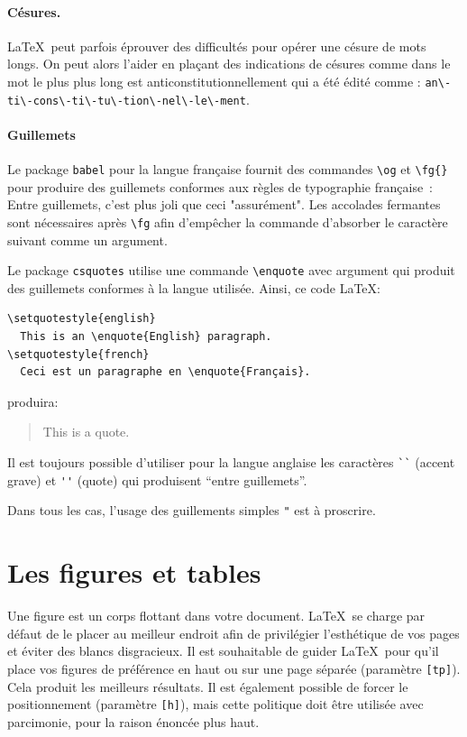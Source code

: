 \paragraph{Césures.} \LaTeX\ peut parfois éprouver des difficultés pour opérer une césure
de mots longs. On peut alors l'aider en plaçant des indications de
césures comme dans \og le mot le plus plus long est
an\-ti\-cons\-ti\-tu\-tion\-nel\-le\-ment\fg{} qui a été édité comme :
\texttt{an\textbackslash-ti\textbackslash-cons\textbackslash-ti\textbackslash-tu\textbackslash-tion\textbackslash-nel\textbackslash-le\textbackslash-ment}.

\paragraph{Guillemets} Le package \texttt{babel} pour la langue
française fournit des commandes \verb+\og+ et \verb+\fg{}+ pour
produire des guillemets conformes aux règles de typographie française~:
\og Entre guillemets, \fg{} c'est plus joli que ceci "assurément". Les
accolades fermantes sont nécessaires après \verb+\fg+ afin d'empêcher
la commande d'absorber le caractère suivant comme un argument.

Le package \texttt{csquotes} utilise une commande \verb+\enquote+ avec
argument qui produit des guillemets conformes à la langue
utilisée. Ainsi, ce code \LaTeX :
\begin{verbatim}
\setquotestyle{english}
  This is an \enquote{English} paragraph.
\setquotestyle{french}
  Ceci est un paragraphe en \enquote{Français}.    
\end{verbatim}

produira:

\begin{quote}
  This is a quote.
\end{quote}

Il est toujours possible d'utiliser pour la langue anglaise les
caractères \verb+``+ (accent grave) et \verb+''+ (quote) qui
produisent ``entre guillemets''.

Dans tous les cas, l'usage des guillements simples \og \texttt{"}
\fg{} est à proscrire.


\section{Les figures et tables}
\label{sec:figandtab}

Une figure est un corps flottant dans votre document. \LaTeX\ se
charge par défaut de le placer au meilleur endroit afin de privilégier
l'esthétique de vos pages et éviter des blancs disgracieux. Il est
souhaitable de guider \LaTeX\ pour qu'il place vos figures de
préférence en haut ou sur une page séparée (paramètre
\texttt{[tp]}). Cela produit les meilleurs résultats. Il est également
possible de forcer le positionnement (paramètre \texttt{[h]}), mais
cette politique doit être utilisée avec parcimonie, pour la raison
énoncée plus haut.


